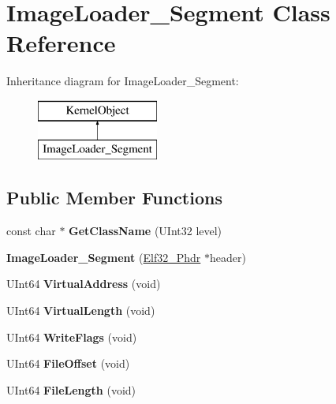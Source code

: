 \hypertarget{class_image_loader___segment}{}\section{Image\+Loader\+\_\+\+Segment Class Reference}
\label{class_image_loader___segment}
Inheritance diagram for Image\+Loader\+\_\+\+Segment\+:\begin{figure}[H]
\begin{center}
\leavevmode
\includegraphics[height=2.000000cm]{class_image_loader___segment}
\end{center}
\end{figure}
\subsection*{Public Member Functions}
\begin{DoxyCompactItemize}
\item 
\mbox{\label{class_image_loader___segment_ade18e83c203c412e785d973ced784d1c}} 
const char $\ast$ {\bfseries Get\+Class\+Name} (U\+Int32 level)
\item 
\mbox{\label{class_image_loader___segment_ae7ca816133fd5608d1f800caf1bfb10a}} 
{\bfseries Image\+Loader\+\_\+\+Segment} (\hyperlink{struct_elf32___phdr}{Elf32\+\_\+\+Phdr} $\ast$header)
\item 
\mbox{\label{class_image_loader___segment_af964b8a8102b0c8b67ea205dcb64288b}} 
U\+Int64 {\bfseries Virtual\+Address} (void)
\item 
\mbox{\label{class_image_loader___segment_a4610f77d9120fe4a52d87b1fdb903b8d}} 
U\+Int64 {\bfseries Virtual\+Length} (void)
\item 
\mbox{\label{class_image_loader___segment_a95638b6c6f6060fe84d41892cf1617e7}} 
U\+Int64 {\bfseries Write\+Flags} (void)
\item 
\mbox{\label{class_image_loader___segment_a75db9682514d94b1c1307c3e094992f4}} 
U\+Int64 {\bfseries File\+Offset} (void)
\item 
\mbox{\label{class_image_loader___segment_aa361c081bcef2b738d937a8a90609b6d}} 
U\+Int64 {\bfseries File\+Length} (void)
\end{DoxyCompactItemize}
